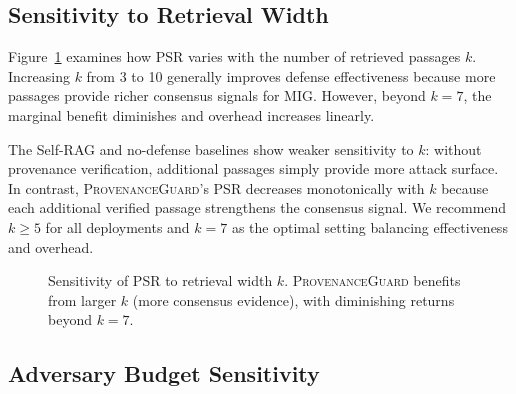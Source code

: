 \documentclass[journal,10pt]{IEEEtran}
\begin{document}
\subsection{Sensitivity to Retrieval Width}

Figure~\ref{fig:sensitivity_k} examines how PSR varies with the number of retrieved passages $k$. Increasing $k$ from 3 to 10 generally improves defense effectiveness because more passages provide richer consensus signals for MIG. However, beyond $k = 7$, the marginal benefit diminishes and overhead increases linearly.

The Self-RAG and no-defense baselines show weaker sensitivity to $k$: without provenance verification, additional passages simply provide more attack surface. In contrast, \textsc{ProvenanceGuard}'s PSR decreases monotonically with $k$ because each additional verified passage strengthens the consensus signal. We recommend $k \geq 5$ for all deployments and $k = 7$ as the optimal setting balancing effectiveness and overhead.

\begin{figure}[t]
\centering
{}
\caption{Sensitivity of PSR to retrieval width $k$. \textsc{ProvenanceGuard} benefits from larger $k$ (more consensus evidence), with diminishing returns beyond $k = 7$.}
\label{fig:sensitivity_k}
\end{figure}

\subsection{Adversary Budget Sensitivity}
\end{document}
